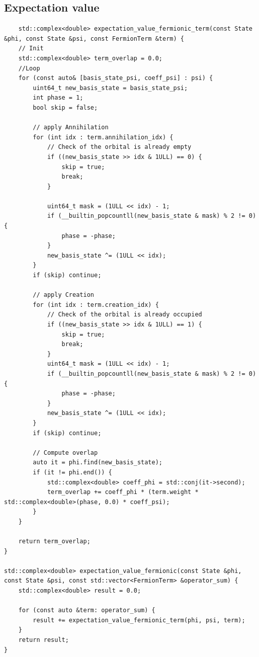\subsection{Expectation value}\label{subsec:apendix-expectation-value}

\begin{verbatim}
    std::complex<double> expectation_value_fermionic_term(const State &phi, const State &psi, const FermionTerm &term) {
    // Init
    std::complex<double> term_overlap = 0.0;
    //Loop
    for (const auto& [basis_state_psi, coeff_psi] : psi) {
        uint64_t new_basis_state = basis_state_psi;
        int phase = 1;
        bool skip = false;

        // apply Annihilation
        for (int idx : term.annihilation_idx) {
            // Check of the orbital is already empty
            if ((new_basis_state >> idx & 1ULL) == 0) {
                skip = true;
                break;
            }

            uint64_t mask = (1ULL << idx) - 1;
            if (__builtin_popcountll(new_basis_state & mask) % 2 != 0) {
                phase = -phase;
            }
            new_basis_state ^= (1ULL << idx);
        }
        if (skip) continue;

        // apply Creation
        for (int idx : term.creation_idx) {
            // Check of the orbital is already occupied
            if ((new_basis_state >> idx & 1ULL) == 1) {
                skip = true;
                break;
            }
            uint64_t mask = (1ULL << idx) - 1;
            if (__builtin_popcountll(new_basis_state & mask) % 2 != 0) {
                phase = -phase;
            }
            new_basis_state ^= (1ULL << idx);
        }
        if (skip) continue;

        // Compute overlap
        auto it = phi.find(new_basis_state);
        if (it != phi.end()) {
            std::complex<double> coeff_phi = std::conj(it->second);
            term_overlap += coeff_phi * (term.weight * std::complex<double>(phase, 0.0) * coeff_psi);
        }
    }

    return term_overlap;
}

std::complex<double> expectation_value_fermionic(const State &phi, const State &psi, const std::vector<FermionTerm> &operator_sum) {
    std::complex<double> result = 0.0;

    for (const auto &term: operator_sum) {
        result += expectation_value_fermionic_term(phi, psi, term);
    }
    return result;
}
\end{verbatim}